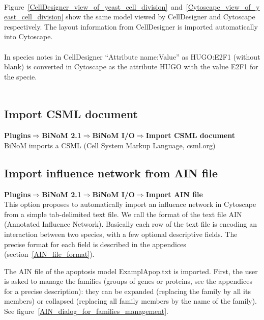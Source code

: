 \\Figure~\ref{CellDesigner_view_of_yeast_cell_division}~and~\ref{Cytoscape_view_of_yeast_cell_division} show the same model viewed by CellDesigner and Cytoscape respectively. The layout information from CellDesigner is imported automatically into Cytoscape.\\\\
In species notes in CellDesigner “Attribute name:Value” as HUGO:E2F1 (without blank) is converted in Cytoscape as the attribute HUGO with the value E2F1 for the specie.\\\\

\subsection{Import CSML document}

\textbf{Plugins$\Rightarrow$BiNoM 2.1$\Rightarrow$BiNoM I/O$\Rightarrow$Import CSML document}\\
BiNoM imports a CSML (Cell System Markup Language, csml.org)

\subsection{Import influence network from AIN file} \label{Import_AIN_file}

\textbf{Plugins$\Rightarrow$BiNoM 2.1$\Rightarrow$BiNoM I/O$\Rightarrow$Import AIN file}\\

This option proposes to automatically import an influence network in Cytoscape
from a simple tab-delimited text file. We call the format of the
text file AIN (Annotated Influence Network). Basically each row of the text file is encoding an
interaction between two species, with a few optional descriptive fields. The precise
format for each field is described in the appendices (section~\ref{AIN_file_format}). 

The AIN file of the apoptosis model ExamplApop.txt is imported. First, the user
is asked to manage the families (groups of genes or proteins, see the appendices
for a precise description): they can be expanded (replacing the family by all
its members) or collapsed (replacing all family members by the name of the
family). See figure~\ref{AIN_dialog_for_families_management}.\\\\

